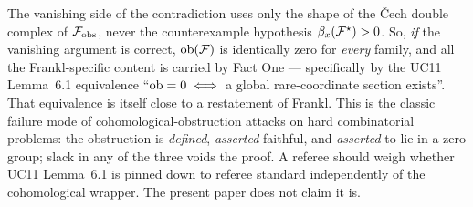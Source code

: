 \begin{remark}
\label{rem:wrapper-risk}
The vanishing side of the contradiction uses only the shape of the
\v{C}ech double complex of $\mathcal{F}_{\mathrm{obs}}$, never the counterexample
hypothesis $\beta_x(\mathcal{F}^{\star})>0$. So, \emph{if} the vanishing argument is
correct, $\mathrm{ob}(\mathcal{F})$ is identically zero for \emph{every} family, and all
the Frankl-specific content is carried by Fact One --- specifically by
the UC11 Lemma~6.1 equivalence ``$\mathrm{ob}=0\iff$ a global rare-coordinate
section exists''. That equivalence is itself close to a restatement of
Frankl. This is the classic failure mode of cohomological-obstruction
attacks on hard combinatorial problems: the obstruction is
\emph{defined}, \emph{asserted} faithful, and \emph{asserted} to lie in
a zero group; slack in any of the three voids the proof. A referee
should weigh whether UC11 Lemma~6.1 is pinned down to referee standard
independently of the cohomological wrapper. The present paper does not
claim it is.
\end{remark}
